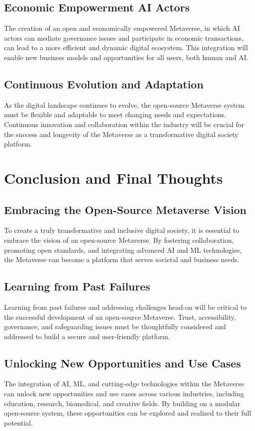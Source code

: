 \subsection{Economic Empowerment AI Actors}
The creation of an open and economically empowered Metaverse, in which AI actors can mediate governance issues and participate in economic transactions, can lead to a more efficient and dynamic digital ecosystem. This integration will enable new business models and opportunities for all users, both human and AI.

\subsection{Continuous Evolution and Adaptation}
As the digital landscape continues to evolve, the open-source Metaverse system must be flexible and adaptable to meet changing needs and expectations. Continuous innovation and collaboration within the industry will be crucial for the success and longevity of the Metaverse as a transformative digital society platform.

\section{Conclusion and Final Thoughts}
\subsection{Embracing the Open-Source Metaverse Vision}
To create a truly transformative and inclusive digital society, it is essential to embrace the vision of an open-source Metaverse. By fostering collaboration, promoting open standards, and integrating advanced AI and ML technologies, the Metaverse can become a platform that serves societal and business needs.

\subsection{Learning from Past Failures}
Learning from past failures and addressing challenges head-on will be critical to the successful development of an open-source Metaverse. Trust, accessibility, governance, and safeguarding issues must be thoughtfully considered and addressed to build a secure and user-friendly platform.

\subsection{Unlocking New Opportunities and Use Cases}
The integration of AI, ML, and cutting-edge technologies within the Metaverse can unlock new opportunities and use cases across various industries, including education, research, biomedical, and creative fields. By building on a modular open-source system, these opportunities can be explored and realized to their full potential.

